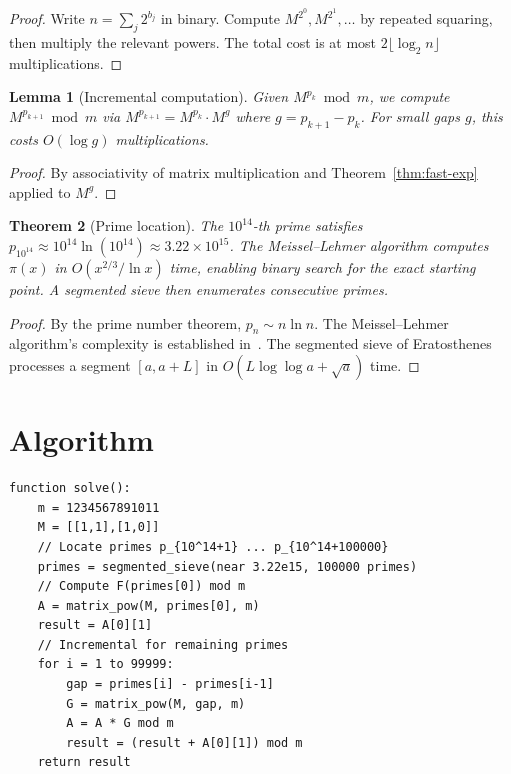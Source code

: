 \documentclass[12pt]{article}
\newtheorem{theorem}{Theorem}
\newtheorem{lemma}[theorem]{Lemma}
\begin{document}
\begin{proof}
Write $n = \sum_j 2^{b_j}$ in binary. Compute $M^{2^0}, M^{2^1}, \ldots$ by repeated squaring, then multiply the relevant powers. The total cost is at most $2\lfloor\log_2 n\rfloor$ multiplications.
\end{proof}

\begin{lemma}[Incremental computation]\label{lem:incremental}
Given $M^{p_k} \bmod m$, we compute $M^{p_{k+1}} \bmod m$ via $M^{p_{k+1}} = M^{p_k} \cdot M^g$ where $g = p_{k+1} - p_k$. For small gaps $g$, this costs $O(\log g)$ multiplications.
\end{lemma}

\begin{proof}
By associativity of matrix multiplication and Theorem~\ref{thm:fast-exp} applied to $M^g$.
\end{proof}

\begin{theorem}[Prime location]\label{thm:prime-loc}
The $10^{14}$-th prime satisfies $p_{10^{14}} \approx 10^{14}\ln(10^{14}) \approx 3.22 \times 10^{15}$. The Meissel--Lehmer algorithm computes $\pi(x)$ in $O(x^{2/3}/\!\ln x)$ time, enabling binary search for the exact starting point. A segmented sieve then enumerates consecutive primes.
\end{theorem}

\begin{proof}
By the prime number theorem, $p_n \sim n \ln n$. The Meissel--Lehmer algorithm's complexity is established in~\cite{deleglise1996}. The segmented sieve of Eratosthenes processes a segment $[a, a+L]$ in $O(L \log\log a + \sqrt{a})$ time.
\end{proof}

\section{Algorithm}
\begin{verbatim}
function solve():
    m = 1234567891011
    M = [[1,1],[1,0]]
    // Locate primes p_{10^14+1} ... p_{10^14+100000}
    primes = segmented_sieve(near 3.22e15, 100000 primes)
    // Compute F(primes[0]) mod m
    A = matrix_pow(M, primes[0], m)
    result = A[0][1]
    // Incremental for remaining primes
    for i = 1 to 99999:
        gap = primes[i] - primes[i-1]
        G = matrix_pow(M, gap, m)
        A = A * G mod m
        result = (result + A[0][1]) mod m
    return result
\end{verbatim}
\end{document}
